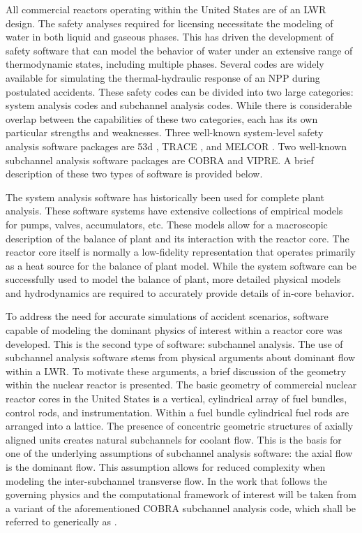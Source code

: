 All commercial reactors operating within the United States are of an LWR design.
The safety analyses required for licensing necessitate the modeling of water in both liquid and gaseous phases.
This has driven the development of safety software that can model the behavior of water under an extensive range of thermodynamic states, including multiple phases.
Several codes are widely available for simulating the thermal-hydraulic response of an NPP during postulated accidents.
These safety codes can be divided into two large categories: system analysis codes and subchannel analysis codes.
While there is considerable overlap between the capabilities of these two categories, each has its own particular strengths and weaknesses.
Three well-known system-level safety analysis software packages are \relap53d{} \cite{RELAP}, TRACE \cite{TRACE}, and MELCOR \cite{Summers1994}.
Two well-known subchannel analysis software packages are COBRA \cite{Thurgood1983c} and VIPRE.
A brief description of these two types of software is provided below.

The system analysis software has historically been used for complete plant analysis.
These software systems have extensive collections of empirical models for pumps, valves, accumulators, etc.
These models allow for a macroscopic description of the balance of plant and its interaction with the
reactor core.
The reactor core itself is normally a low-fidelity representation that operates primarily as a heat source for the balance of plant model.
While the system software can be successfully used to model the balance of plant, more detailed physical models and hydrodynamics are required to accurately provide details of in-core behavior.

To address the need for accurate simulations of accident scenarios, software capable of modeling the dominant physics of interest within a reactor core was developed.
This is the second type of software: subchannel analysis.
The use of subchannel analysis software stems from physical arguments about dominant flow within a LWR.
To motivate these arguments, a brief discussion of the geometry within the nuclear reactor is presented.
The basic geometry of commercial nuclear reactor cores in the United States is a vertical, cylindrical array of fuel bundles, control rods, and instrumentation.
Within a fuel bundle cylindrical fuel rods are arranged into a lattice.
The presence of concentric geometric structures of axially aligned units creates natural subchannels for coolant flow.
This is the basis for one of the underlying assumptions of subchannel analysis software: the axial flow is the dominant flow.
This assumption allows for reduced complexity when modeling the inter-subchannel transverse flow.
In the work that follows the governing physics and the computational framework of interest will be taken from a variant of the aforementioned COBRA subchannel analysis code, which shall be referred to generically as \cobra{}.

